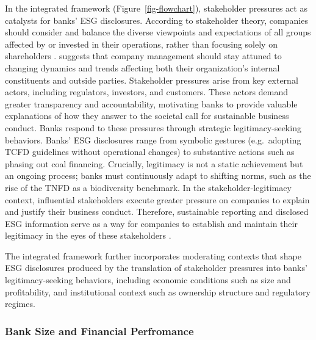 \documentclass[
  authoryear]{elsarticle}
\begin{document}
In the integrated framework (Figure~\ref{fig-flowchart}), stakeholder
pressures act as catalysts for banks' ESG disclosures. According to
stakeholder theory, companies should consider and balance the diverse
viewpoints and expectations of all groups affected by or invested in
their operations, rather than focusing solely on shareholders
\citep{BUCHHOLZ2005, LAPLUME2008}. \citet{FREEMAN1984} suggests that
company management should stay attuned to changing dynamics and trends
affecting both their organization's internal constituents and outside
parties. Stakeholder pressures arise from key external actors, including
regulators, investors, and customers. These actors demand greater
transparency and accountability, motivating banks to provide valuable
explanations of how they answer to the societal call for sustainable
business conduct. Banks respond to these pressures through strategic
legitimacy-seeking behaviors. Banks' ESG disclosures range from symbolic
gestures (e.g.~adopting TCFD guidelines without operational changes) to
substantive actions such as phasing out coal financing. Crucially,
legitimacy is not a static achievement but an ongoing process; banks
must continuously adapt to shifting norms, such as the rise of the TNFD
as a biodiversity benchmark. In the stakeholder-legitimacy context,
influential stakeholders execute greater pressure on companies to
explain and justify their business conduct. Therefore, sustainable
reporting and disclosed ESG information serve as a way for companies to
establish and maintain their legitimacy in the eyes of these
stakeholders \citep{CAMPBELL_D2003}.

The integrated framework further incorporates moderating contexts that
shape ESG disclosures produced by the translation of stakeholder
pressures into banks' legitimacy-seeking behaviors, including economic
conditions such as size and profitability, and institutional context
such as ownership structure and regulatory regimes.

\subsubsection{Bank Size and Financial
Perfromance}\label{bank-size-and-financial-perfromance}
\end{document}
